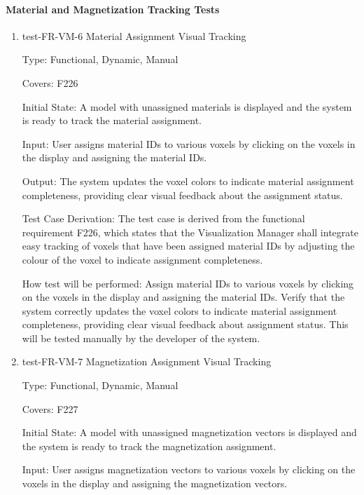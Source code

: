 \documentclass[12pt, titlepage]{article}
\begin{document}
\paragraph{Material and Magnetization Tracking Tests}

\begin{enumerate}

\item{test-FR-VM-6 Material Assignment Visual Tracking\\}

Type: Functional, Dynamic, Manual

Covers: F226
					
Initial State: A model with unassigned materials is displayed and the system is ready to track the material assignment.
					
Input: User assigns material IDs to various voxels by clicking on the voxels in the display and assigning the material IDs.
					
Output: The system updates the voxel colors to indicate material assignment completeness, providing clear visual feedback about the assignment status.

Test Case Derivation: The test case is derived from the functional requirement F226, which states that the Visualization Manager shall integrate easy tracking of voxels that have been assigned material IDs by adjusting the colour of the voxel to indicate assignment completeness.
					
How test will be performed: Assign material IDs to various voxels by clicking on the voxels in the display and assigning the material IDs. Verify that the system correctly updates the voxel colors to indicate material assignment completeness, providing clear visual feedback about assignment status. This will be tested manually by the developer of the system.

\item{test-FR-VM-7 Magnetization Assignment Visual Tracking\\}

Type: Functional, Dynamic, Manual

Covers: F227
					
Initial State: A model with unassigned magnetization vectors is displayed and the system is ready to track the magnetization assignment.
					
Input: User assigns magnetization vectors to various voxels by clicking on the voxels in the display and assigning the magnetization vectors.
					

\end{enumerate}
\end{document}
